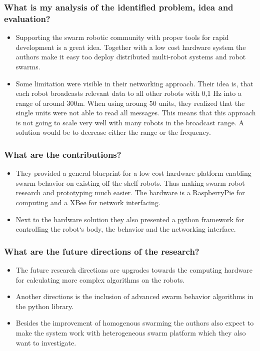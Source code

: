 \documentclass{article}
\begin{document}
\subsubsection*{What is my analysis of the identified problem, idea and evaluation?}
\begin{itemize}
    \item Supporting the swarm robotic community with proper tools for rapid development is a great idea. Together with a low cost hardware system the authors make it easy too deploy distributed multi-robot systems and robot swarms.
    \item Some limitation were visible in their networking approach. Their idea is, that each robot broadcasts relevant data to all other robots with 0,1 Hz into a range of around 300m. When using aroung 50 units, they realized that the single units were not able to read all messages. This means that this approach is not going to scale very well with many robots in the broadcast range. A solution would be to decrease either the range or the frequency.
\end{itemize}
\subsubsection*{What are the contributions?}
\begin{itemize}
    \item They provided a general blueprint for a low cost hardware platform enabling swarm behavior on existing off-the-shelf robots. Thus making swarm robot research and prototyping much easier. The hardware is a RaspberryPie for computing and a XBee for network interfacing.
    \item Next to the hardware solution they also presented a python framework for controlling the robot`s body, the behavior and the networking interface.
\end{itemize}
\subsubsection*{What are the future directions of the research?}
\begin{itemize}
    \item The future research directions are upgrades towards the computing hardware for calculating more complex algorithms on the robots. 
    \item Another directions is the inclusion of advanced swarm behavior algorithms in the python library.
    \item Besides the improvement of homogenous swarming the authors also expect to make the system work with heterogeneous swarm platform which they also want to investigate.
\end{itemize}
\end{document}
